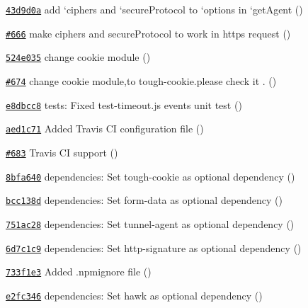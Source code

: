 \begin{DoxyItemize}
\item \href{https://github.com/mikeal/request/commit/43d9d0a76974d2c61681ddee04479d514ebfa320}{\tt 43d9d0a} add `ciphers\textquotesingle{} and `secure\+Protocol\textquotesingle{} to `options\textquotesingle{} in `get\+Agent\textquotesingle{} ()
\item \href{https://github.com/mikeal/request/pull/666}{\tt \#666} make {\ttfamily ciphers} and {\ttfamily secure\+Protocol} to work in https request ()
\item \href{https://github.com/mikeal/request/commit/524e0356b73240409a11989d369511419526b5ed}{\tt 524e035} change cookie module ()
\item \href{https://github.com/mikeal/request/pull/674}{\tt \#674} change cookie module,to tough-\/cookie.\+please check it . ()
\item \href{https://github.com/mikeal/request/commit/e8dbcc83d4eff3c14e03bd754174e2c5d45f2872}{\tt e8dbcc8} tests\+: Fixed test-\/timeout.\+js events unit test ()
\item \href{https://github.com/mikeal/request/commit/aed1c71fac0047b66a236a990a5569445cfe995d}{\tt aed1c71} Added Travis C\+I configuration file ()
\item \href{https://github.com/mikeal/request/pull/683}{\tt \#683} Travis C\+I support ()
\item \href{https://github.com/mikeal/request/commit/8bfa6403ce03cbd3f3de6b82388bfcc314e56c61}{\tt 8bfa640} dependencies\+: Set {\ttfamily tough-\/cookie} as optional dependency ()
\item \href{https://github.com/mikeal/request/commit/bcc138da67b7e1cf29dc7d264a73d8b1d1f4b0e4}{\tt bcc138d} dependencies\+: Set {\ttfamily form-\/data} as optional dependency ()
\item \href{https://github.com/mikeal/request/commit/751ac28b7f13bfeff2a0e920ca2926a005dcb6f0}{\tt 751ac28} dependencies\+: Set {\ttfamily tunnel-\/agent} as optional dependency ()
\item \href{https://github.com/mikeal/request/commit/6d7c1c9d8e3a300ff6f2a93e7f3361799acf716b}{\tt 6d7c1c9} dependencies\+: Set {\ttfamily http-\/signature} as optional dependency ()
\item \href{https://github.com/mikeal/request/commit/733f1e3ae042a513a18cde1c6e444b18ee07ad66}{\tt 733f1e3} Added .npmignore file ()
\item \href{https://github.com/mikeal/request/commit/e2fc346b7e5e470fcd36189bcadf63c53feebb22}{\tt e2fc346} dependencies\+: Set {\ttfamily hawk} as optional dependency ()

\end{DoxyItemize}
